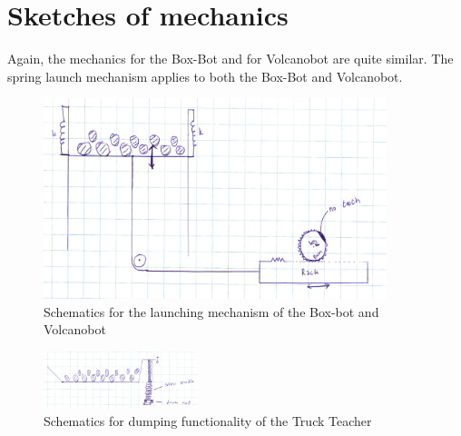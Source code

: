\documentclass[11pt,twoside,a4paper]{report}
\begin{document}
\section{Sketches of mechanics}
Again, the mechanics for the Box-Bot and for Volcanobot are quite similar. The spring launch mechanism applies to both the Box-Bot and Volcanobot.
\begin{figure}[h]
  \begin{center}
    \includegraphics[width=10cm]{Images/launchmechschematic.jpg}
  \end{center}
  \caption{Schematics for the launching mechanism of the Box-bot and Volcanobot}
  \label{figure:launchscheme}
\end{figure}
\begin{figure}[h]
  \begin{center}
    \includegraphics[width=0.4\textwidth]{Images/tipmechschematic.jpg}
  \end{center}
  \caption{Schematics for dumping functionality of the Truck Teacher}
  \label{figure:tipscheme}
\end{figure}
\end{document}
